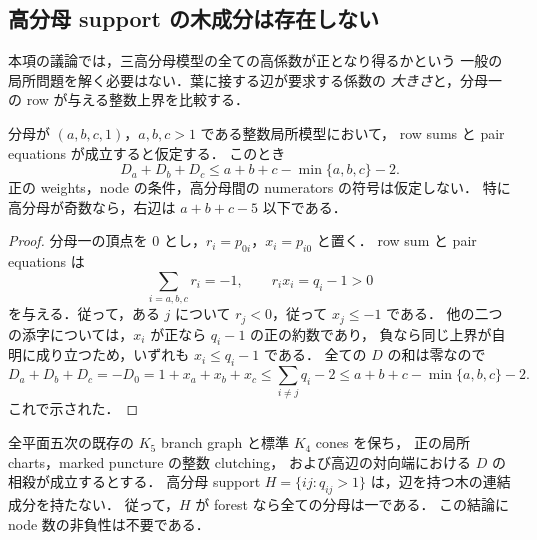 \subsection{高分母 support の木成分は存在しない}
\label{fo13:section}

本項の議論では，三高分母模型の全ての高係数が正となり得るかという
一般の局所問題を解く必要はない．葉に接する辺が要求する係数の
\emph{大きさ}と，分母一の row が与える整数上界を比較する．

\begin{lemma}[三高分母の係数和の上界]\label{fo13:center-bound}
分母が $(a,b,c,1)$，$a,b,c>1$ である整数局所模型において，
row sums と pair equations が成立すると仮定する．
このとき
\begin{equation}\label{fo13:center-inequality}
 D_a+D_b+D_c
 \leq a+b+c-\min\{a,b,c\}-2.
\end{equation}
正の weights，node の条件，高分母間の numerators の符号は仮定しない．
特に高分母が奇数なら，右辺は $a+b+c-5$ 以下である．
\end{lemma}

\begin{proof}
分母一の頂点を $0$ とし，$r_i=p_{0i}$，$x_i=p_{i0}$ と置く．
row sum と pair equations は
\[
 \sum_{i=a,b,c}r_i=-1,\qquad r_ix_i=q_i-1>0
\]
を与える．従って，ある $j$ について $r_j<0$，従って $x_j\leq-1$ である．
他の二つの添字については，$x_i$ が正なら $q_i-1$ の正の約数であり，
負なら同じ上界が自明に成り立つため，いずれも $x_i\leq q_i-1$ である．
全ての $D$ の和は零なので
\[
 D_a+D_b+D_c=-D_0=1+x_a+x_b+x_c
 \leq\sum_{i\ne j}q_i-2
 \leq a+b+c-\min\{a,b,c\}-2.
\]
これで示された．
\end{proof}

\begin{theorem}[木成分の排除]\label{fo13:no-tree}
全平面五次の既存の $K_5$ branch graph と標準 $K_4$ cones を保ち，
正の局所 charts，marked puncture の整数 clutching，
および高辺の対向端における $D$ の相殺が成立するとする．
高分母 support $H=\{ij:q_{ij}>1\}$ は，辺を持つ木の連結成分を持たない．
従って，$H$ が forest なら全ての分母は一である．
この結論に node 数の非負性は不要である．
\end{theorem}

